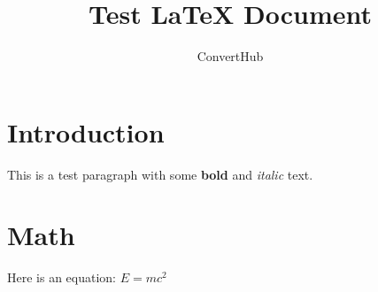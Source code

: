 \documentclass{article}
\title{Test LaTeX Document}
\author{ConvertHub}
\begin{document}
\maketitle
\section{Introduction}
This is a test paragraph with some \textbf{bold} and \textit{italic} text.

\section{Math}
Here is an equation: $E = mc^2$
\end{document}
